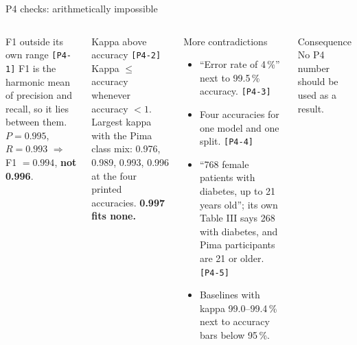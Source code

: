 \documentclass[aspectratio=169,10pt,t,xcolor={table}]{beamer}
\begin{document}
\begin{frame}{P4 checks: arithmetically impossible}
\begin{columns}[T]
\begin{alertblock}{F1 outside its own range \texttt{[P4-1]}}
\footnotesize
F1 is the harmonic mean of precision and recall, so it lies between them.\\
$P=0.995$, $R=0.993$ $\Rightarrow$ F1 $=0.994$, \textbf{not 0.996}.
\end{alertblock}
\begin{alertblock}{Kappa above accuracy \texttt{[P4-2]}}
\footnotesize
Kappa $\le$ accuracy whenever accuracy $<1$.\\
Largest kappa with the Pima class mix: 0.976, 0.989, 0.993, 0.996 at the four printed accuracies. \textbf{0.997 fits none.}
\end{alertblock}
\begin{alertblock}{More contradictions}
\footnotesize
\begin{itemize}
  \item ``Error rate of 4\,\%'' next to 99.5\,\% accuracy. \texttt{[P4-3]}
  \item Four accuracies for one model and one split. \texttt{[P4-4]}
  \item ``768 female patients with diabetes, up to 21 years old''; its own Table III says 268 with diabetes, and Pima participants are 21 or older. \texttt{[P4-5]}
  \item Baselines with kappa 99.0--99.4\,\% next to accuracy bars below 95\,\%.
\end{itemize}
\end{alertblock}
\begin{block}{Consequence}
\footnotesize No P4 number should be used as a result.
\end{block}
\end{columns}
\end{frame}
\end{document}
